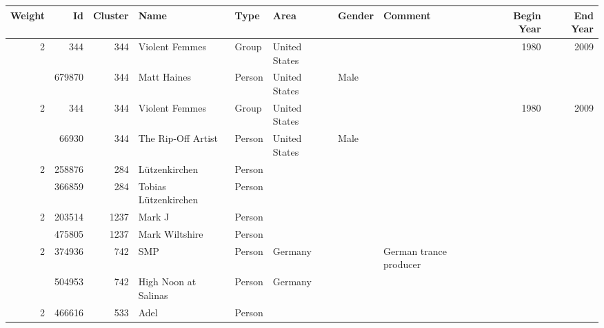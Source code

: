 \begin{tabular}{|r|rrlllllrr|}
\hline
   Weight &     Id &   Cluster & Name                  & Type   & Area           & Gender   & Comment                                           &   Begin Year &   End Year \\
\hline
\multirow{2}{*}{2} &    344 &       344 & Violent Femmes        & Group  & United States  &          &                                                   &         1980 &       2009 \\
         & 679870 &       344 & Matt Haines           & Person & United States  & Male     &                                                   &              &            \\
\hline
\multirow{2}{*}{2} &    344 &       344 & Violent Femmes        & Group  & United States  &          &                                                   &         1980 &       2009 \\
         &  66930 &       344 & The Rip-Off Artist    & Person & United States  & Male     &                                                   &              &            \\
\hline
\multirow{2}{*}{2} & 258876 &       284 & Lützenkirchen         & Person &                &          &                                                   &              &            \\
         & 366859 &       284 & Tobias Lützenkirchen  & Person &                &          &                                                   &              &            \\
\hline
\multirow{2}{*}{2} & 203514 &      1237 & Mark J                & Person &                &          &                                                   &              &            \\
         & 475805 &      1237 & Mark Wiltshire        & Person &                &          &                                                   &              &            \\
\hline
\multirow{2}{*}{2} & 374936 &       742 & SMP                   & Person & Germany        &          & German trance producer                            &              &            \\
         & 504953 &       742 & High Noon at Salinas  & Person & Germany        &          &                                                   &              &            \\
\hline
\multirow{2}{*}{2} & 466616 &       533 & Adel                  & Person &                &          &                                                   &              &            \\

\end{tabular}
